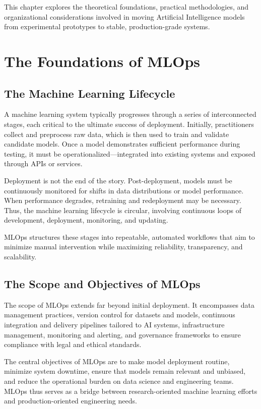 \documentclass[openany]{book}
\begin{document}
This chapter explores the theoretical foundations, practical methodologies, and 
organizational considerations involved in moving Artificial Intelligence models 
from experimental prototypes to stable, production-grade systems.

\section{The Foundations of MLOps}

\subsection{The Machine Learning Lifecycle}
A machine learning system typically progresses through a series of 
interconnected stages, each critical to the ultimate success of deployment. 
Initially, practitioners collect and preprocess raw data, which is then used to 
train and validate candidate models. Once a model demonstrates sufficient 
performance during testing, it must be operationalized—integrated into existing 
systems and exposed through APIs or services.

Deployment is not the end of the story. Post-deployment, models must be 
continuously monitored for shifts in data distributions or model performance. 
When performance degrades, retraining and redeployment may be necessary. Thus, 
the machine learning lifecycle is circular, involving continuous loops of 
development, deployment, monitoring, and updating.

MLOps structures these stages into repeatable, automated workflows that aim to 
minimize manual intervention while maximizing reliability, transparency, and 
scalability.

\subsection{The Scope and Objectives of MLOps}
The scope of MLOps extends far beyond initial deployment. It encompasses data 
management practices, version control for datasets and models, continuous 
integration and delivery pipelines tailored to AI systems, infrastructure 
management, monitoring and alerting, and governance frameworks to ensure 
compliance with legal and ethical standards.

The central objectives of MLOps are to make model deployment routine, minimize 
system downtime, ensure that models remain relevant and unbiased, and reduce 
the operational burden on data science and engineering teams. MLOps thus serves 
as a bridge between research-oriented machine learning efforts and 
production-oriented engineering needs.
\end{document}
